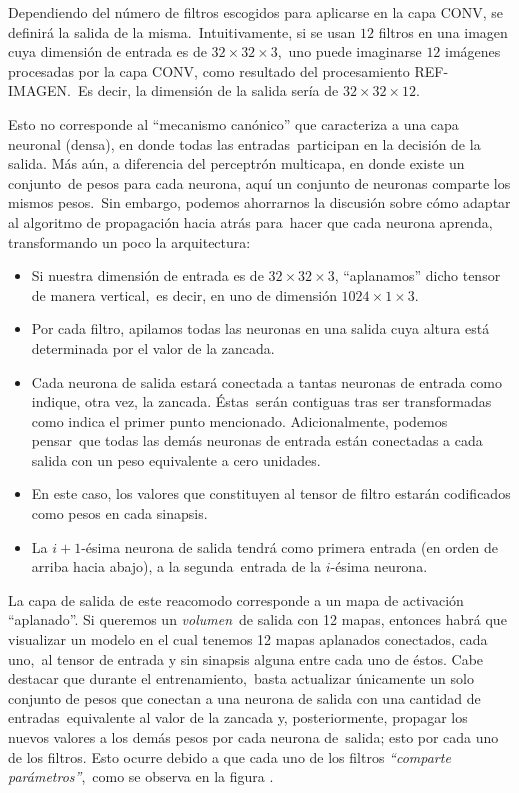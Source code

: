 \noindent
Dependiendo del número de filtros escogidos para aplicarse en la capa CONV, se definirá la salida de la misma.\
Intuitivamente, si se usan $12$ filtros en una imagen cuya dimensión de entrada es de $32 \times 32 \times 3$,\
uno puede imaginarse $12$ imágenes procesadas por la capa CONV, como resultado del procesamiento REF-IMAGEN.\
Es decir, la dimensión de la salida sería de $32 \times 32 \times 12$.\par
Esto no corresponde al ``mecanismo canónico'' que caracteriza a una capa neuronal (densa), en donde todas las entradas\
participan en la decisión de la salida. Más aún, a diferencia del perceptrón multicapa, en donde existe un conjunto\
de pesos para cada neurona, aquí un conjunto de neuronas comparte los mismos pesos.\
Sin embargo, podemos ahorrarnos la discusión sobre cómo adaptar al algoritmo de propagación hacia atrás para\
hacer que cada neurona aprenda, transformando un poco la arquitectura:
\begin{itemize}
\item Si nuestra dimensión de entrada es de $32 \times 32 \times 3$, ``aplanamos'' dicho tensor de manera vertical,\
  es decir, en uno de dimensión $1024 \times 1 \times 3$.
\item Por cada filtro, apilamos todas las neuronas en una salida cuya altura está determinada por el valor de la zancada.
\item Cada neurona de salida estará conectada a tantas neuronas de entrada como indique, otra vez, la zancada. Éstas\
  serán contiguas tras ser transformadas como indica el primer punto mencionado. Adicionalmente, podemos pensar\
  que todas las demás neuronas de entrada están conectadas a cada salida con un peso equivalente a cero unidades.
\item En este caso, los valores que constituyen al tensor de filtro estarán codificados como pesos en cada sinapsis.
\item La $i+1$-ésima neurona de salida tendrá como primera entrada (en orden de arriba hacia abajo), a la segunda\
  entrada de la $i$-ésima neurona.
\end{itemize}\par
La capa de salida de este reacomodo corresponde a un mapa de activación ``aplanado''. Si queremos un \emph{volumen}\
de salida con 12 mapas, entonces habrá que visualizar un modelo en el cual tenemos 12 mapas aplanados conectados, cada uno,\
al tensor de entrada y sin sinapsis alguna entre cada uno de éstos. Cabe destacar que durante el entrenamiento,\
basta actualizar únicamente un solo conjunto de pesos que conectan a una neurona de salida con una cantidad de entradas\
equivalente al valor de la zancada y, posteriormente, propagar los nuevos valores a los demás pesos por cada neurona de\
salida; esto por cada uno de los filtros. Esto ocurre debido a que cada uno de los filtros \emph{``comparte parámetros''},\
como se observa en la figura \label{fCNN_fig}.

